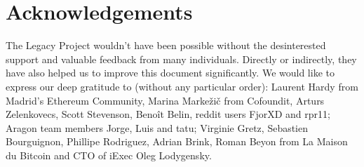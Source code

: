 \chapter*{Acknowledgements}

The Legacy Project wouldn't have been possible without the desinterested support and valuable feedback from many individuals.
Directly or indirectly, they have also helped us to improve this document significantly.
We would like to express our deep gratitude to (without any particular order):
Laurent Hardy from Madrid's Ethereum Community, Marina Markežič from Cofoundit, Arturs Zelenkovecs, Scott Stevenson, Benoît Belin, reddit users FjorXD and rpr11; Aragon team members Jorge, Luis and tatu; Virginie Gretz, Sebastien Bourguignon, Phillipe Rodriguez, Adrian Brink, Roman Beyon from La Maison du Bitcoin and CTO of iExec Oleg Lodygensky.



